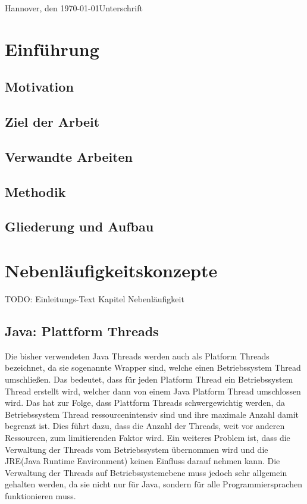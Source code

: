 \documentclass[fontsize=12pt,paper=a4,twoside=semi,parskip=half-,headsepline,headinclude]{scrreprt}
\begin{document}
Hannover, den \today \hfill Unterschrift


\newpage 
\thispagestyle{empty}
\quad 
\newpage


  \tableofcontents  %

\listoffigures      %

\listoftables       %

\chapter{Einführung}

\section{Motivation}

\section{Ziel der Arbeit}

\section{Verwandte Arbeiten}

\section{Methodik}

\section{Gliederung und Aufbau}



\chapter{Nebenläufigkeitskonzepte}

TODO: Einleitungs-Text Kapitel Nebenläufigkeit

\section{Java: Plattform Threads}

Die bisher verwendeten Java Threads werden auch als Platform Threads bezeichnet, da sie sogenannte Wrapper sind, welche einen Betriebssystem Thread umschließen. Das bedeutet, dass für jeden Platform Thread ein Betriebssystem Thread erstellt wird, welcher dann von einem Java Platform Thread umschlossen wird. Das hat zur Folge, dass Plattform Threads schwergewichtig werden, da Betriebssystem Thread ressourcenintensiv sind und ihre maximale Anzahl damit begrenzt ist. Dies führt dazu, dass die Anzahl der Threads, weit vor anderen Ressourcen, zum limitierenden Faktor wird. Ein weiteres Problem ist, dass die Verwaltung der Threads
vom Betriebssystem übernommen wird und die JRE(Java Runtime Environment) keinen Einfluss darauf nehmen kann. Die Verwaltung der Threads auf Betriebssystemebene muss jedoch sehr allgemein gehalten werden, da sie nicht nur für Java, sondern für alle Programmiersprachen funktionieren muss.
\end{document}
